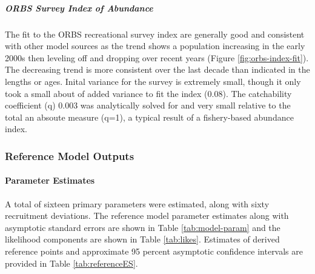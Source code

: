 \documentclass[11pt,
  english,
  a4paper,
]{article}
\begin{document}
\leavevmode\tagmcend\tagstructend\par


\hypertarget{orbs-survey-index-of-abundance}{%
\subparagraph{ORBS Survey Index of Abundance}\label{orbs-survey-index-of-abundance}}

\leavevmode\tagmcend\tagstructend


The fit to the ORBS recreational survey index are generally good and consistent with other model sources as the trend shows a population increasing in the early 2000s then leveling off and dropping over recent years (Figure \ref{fig:orbs-index-fit}). The decreasing trend is more consistent over the last decade than indicated in the lengths or ages. Inital variance for the survey is extremely small, though it only took a small about of added variance to fit the index (0.08). The catchability coefficient (q) 0.003 was analytically solved for and very small relative to the total an absoute measure (q=1), a typical result of a fishery-based abundance index.

\leavevmode\tagmcend\tagstructend\par


\hypertarget{reference-model-outputs}{%
\subsubsection{Reference Model Outputs}\label{reference-model-outputs}}

\leavevmode\tagmcend\tagstructend


\hypertarget{parameter-estimates}{%
\paragraph{Parameter Estimates}\label{parameter-estimates}}

\leavevmode\tagmcend\tagstructend


A total of sixteen primary parameters were estimated, along with sixty recruitment deviations. The reference model parameter estimates along with asymptotic standard errors are shown in Table \ref{tab:model-param} and the likelihood components are shown in Table \ref{tab:likes}. Estimates of derived reference points and approximate 95 percent asymptotic confidence intervals are provided in Table \ref{tab:referenceES}.
\end{document}
